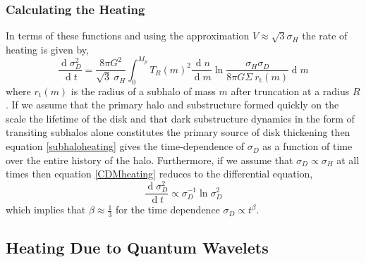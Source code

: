 \documentclass[usenatbib]{mnras}
\renewcommand{\d}[1]{\! \mathrm{d}#1 \:}
\newcommand{\deriv}[2]{\frac{\d{#1}}{\d{#2}}}
\renewcommand{\d}[1]{\ensuremath{\operatorname{d}\!{#1}}}
\begin{document}
\subsubsection{Calculating the Heating}

In terms of these functions and using the approximation $V \approx \sqrt{3} \sigma_H$ the rate of heating is given by,
\begin{equation} \label{subhaloheating}
\deriv{\sigma_D^2}{t} = \frac{8 \pi G^2}{\sqrt{3} \: \sigma_H} \int_0^{M_p} T_R(m)^2  \deriv{n}{m}  \ln{\frac{\sigma_H \sigma_D}{8 \pi G \Sigma \: r_{\text{t}}(m)}} \d{m}
\end{equation}   
where $r_{\text{t}}(m)$ is the radius of a subhalo of mass $m$ after truncation at a radius $R$. 
If we assume that the primary halo and substructure formed quickly on the scale the lifetime of the disk and that dark substructure dynamics in the form of transiting subhalos alone constitutes the primary source of disk thickening then equation \ref{subhaloheating} gives the time-dependence of $\sigma_D$ as a function of time over the entire history of the halo. Furthermore, if we assume that $\sigma_D \propto \sigma_H$ at all times then equation \ref{CDMheating} reduces to the differential equation,
\begin{equation}
\deriv{\sigma_D^2}{t} \propto \sigma_D^{-1} \ln{\sigma_D^2} 
\end{equation} 
which implies that $\beta \approx \frac{1}{3}$ for the time dependence $\sigma_D \propto t^\beta$. 

\subsection{Heating Due to Quantum Wavelets}
\end{document}
